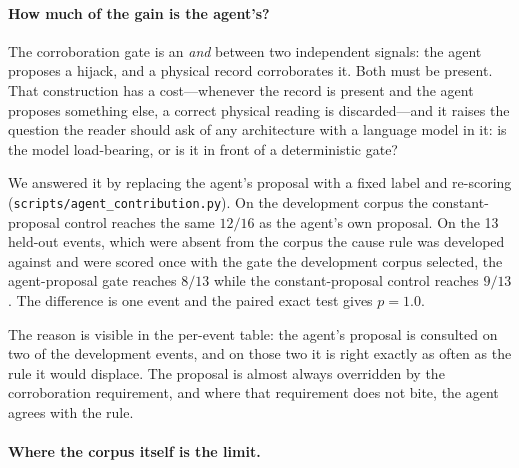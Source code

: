 \paragraph{How much of the gain is the agent's?}
\label{sec:eval-agent-reach}

The corroboration gate is an \emph{and} between two independent signals:
the agent proposes a hijack, and a physical record corroborates it. Both
must be present. That construction has a cost---whenever the record is
present and the agent proposes something else, a correct physical reading is
discarded---and it raises the question the reader should ask of any
architecture with a language model in it: is the model load-bearing, or is
it in front of a deterministic gate?

We answered it by replacing the agent's proposal with a fixed label and
re-scoring (\texttt{scripts/agent\_contribution.py}). On the development
corpus the constant-proposal control reaches the same $12/16$ as the
agent's own proposal. On the 13 held-out events, which were absent from the
corpus the cause rule was developed against and were scored once with the
gate the development corpus selected, the agent-proposal gate reaches
$8/13$ while the constant-proposal control reaches $9/13$. The difference
is one event and the paired exact test gives $p=1.0$.

The reason is visible in the per-event table: the agent's proposal is
consulted on two of the development events, and on those two it is right
exactly as often as the rule it would displace. The proposal is
almost always overridden by the corroboration requirement, and where that
requirement does not bite, the agent agrees with the rule.

\paragraph{Where the corpus itself is the limit.}
\label{sec:eval-agent-leak-limit}

